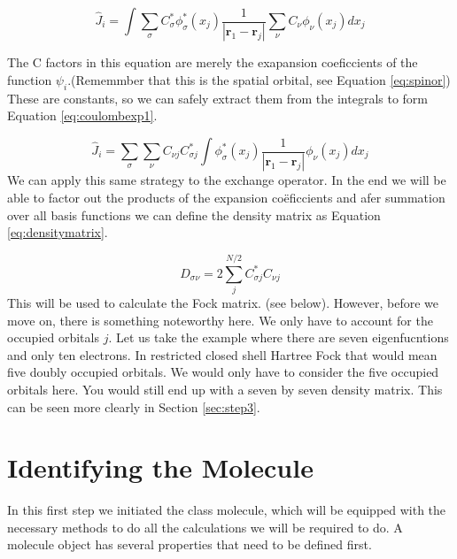\begin{equation}\label{eq:coulombexp}
    \hat{J}_i = \int\sum_{\sigma}C^*_{\sigma}\phi^*_{\sigma}(x_j)\frac{1}{|\boldsymbol{r}_1 - \boldsymbol{r}_j|}\sum_{\nu}C_{\nu}\phi_{\nu}(x_j)dx_j
\end{equation}

The C factors in this equation are merely the exapansion coeficcients of the function
$\psi_i$.(Rememmber that this is the spatial orbital, see Equation \ref{eq:spinor})
These are constants, so we can safely extract them from the integrals to form
Equation \ref{eq:coulombexp1}.

\begin{equation}\label{eq:coulombexp1}
    \hat{J}_i = \sum_{\sigma}\sum_{\nu}C_{\nu j}C^*_{\sigma j}\int\phi^*_{\sigma}(x_j)\frac{1}{|\boldsymbol{r}_1 - \boldsymbol{r}_j|}\phi_{\nu}(x_j)dx_j
\end{equation}
We can apply this same strategy to the exchange operator. In the end we will be
able to factor out the products of the expansion coëficcients and afer summation
over all basis functions we can define the density matrix as Equation 
\ref{eq:densitymatrix}.

\begin{equation}\label{eq:densitymatrix}
    D_{\sigma\nu} = 2\sum^{N/2}_jC_{\sigma j}^*C_{\nu j}
\end{equation}
This will be used to calculate the Fock matrix. (see below). However, before we 
move on, there is something noteworthy here. We only have to account for the 
occupied orbitals $j$. Let us take the example where there are seven eigenfucntions
and only ten electrons. In restricted closed shell Hartree Fock that would mean
five doubly occupied orbitals. We would only have to consider the five occupied
orbitals here. You would still end up with a seven by seven density matrix. This
can be seen more clearly in Section \ref{sec:step3}.

\section{Identifying the Molecule}
\label{sec:step1}
In this first step we initiated the class molecule, which will be equipped with 
the necessary methods to do all the calculations we will be required to do. 
A molecule object has several properties that need to be defined first. 


